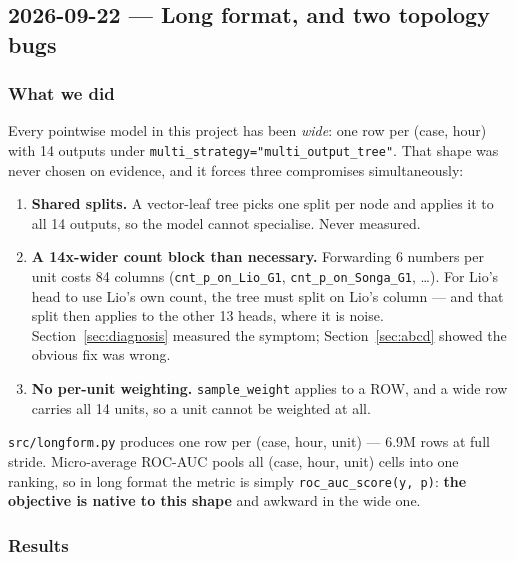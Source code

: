\subsection{2026-09-22 --- Long format, and two topology bugs}
\label{sec:longform}

\subsubsection*{What we did}

Every pointwise model in this project has been \emph{wide}: one row per (case, hour) with 14
outputs under \texttt{multi\_strategy="multi\_output\_tree"}. That shape was never chosen on
evidence, and it forces three compromises simultaneously:

\begin{enumerate}
  \item \textbf{Shared splits.} A vector-leaf tree picks one split per node and applies it to all
    14 outputs, so the model cannot specialise. Never measured.
  \item \textbf{A 14x-wider count block than necessary.} Forwarding 6 numbers per unit costs 84
    columns (\texttt{cnt\_p\_on\_Lio\_G1}, \texttt{cnt\_p\_on\_Songa\_G1}, \ldots). For Lio's
    head to use Lio's own count, the tree must split on Lio's column --- and that split then
    applies to the other 13 heads, where it is noise. Section~\ref{sec:diagnosis} measured the
    symptom; Section~\ref{sec:abcd} showed the obvious fix was wrong.
  \item \textbf{No per-unit weighting.} \texttt{sample\_weight} applies to a ROW, and a wide row
    carries all 14 units, so a unit cannot be weighted at all.
\end{enumerate}

\texttt{src/longform.py} produces one row per (case, hour, unit) --- 6.9M rows at full stride.
Micro-average ROC-AUC pools all (case, hour, unit) cells into one ranking, so in long format the
metric is simply \texttt{roc\_auc\_score(y, p)}: \textbf{the objective is native to this shape}
and awkward in the wide one.

\subsubsection*{Results}

